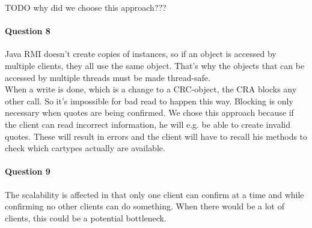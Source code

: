 \documentclass{ds-report}
\begin{document}
	TODO why did we choose this approach???
	
	\paragraph{Question 8} 
	Java RMI doesn't create copies of instances, so if an object is accessed by multiple clients, they all use the same object. That's why the objects that can be accessed by multiple threads must be made thread-safe.\\
	
	
	When a write is done, which is a change to a CRC-object, the CRA blocks any other call. So it's impossible for bad read to happen this way. Blocking is only necessary when quotes are being confirmed. We chose this approach because if the client can read incorrect information, he will e.g. be able to create invalid quotes. These will result in errors and the client will have to recall his methods to check which cartypes actually are available. 
	
	\paragraph{Question 9} 
	The scalability is affected in that only one client can confirm at a time and while confirming no other clients can do something. When there would be a lot of clients, this could be a potential bottleneck. 
	
	\clearpage
	
	
\end{document}

